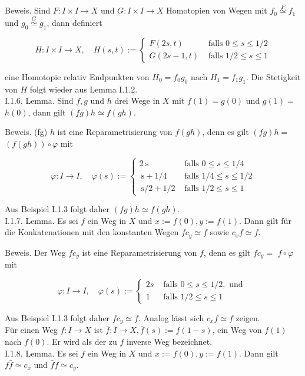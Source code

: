 \documentclass[10pt]{article}
\begin{document}
Beweis. Sind $F: I \times I \rightarrow X$ und $G: I \times I \rightarrow X$ Homotopien von Wegen mit $f_{0} \stackrel{F}{\simeq} f_{1}$ und $g_{0} \stackrel{G}{\simeq} g_{1}$, dann definiert

$$
H: I \times I \rightarrow X, \quad H(s, t):= \begin{cases}F(2 s, t) & \text { falls } 0 \leq s \leq 1 / 2 \\ G(2 s-1, t) & \text { falls } 1 / 2 \leq s \leq 1\end{cases}
$$

eine Homotopie relativ Endpunkten von $H_{0}=f_{0} g_{0}$ nach $H_{1}=f_{1} g_{1}$. Die Stetigkeit von $H$ folgt wieder aus Lemma I.1.2.\\
I.1.6. Lemma. Sind $f, g$ und $h$ drei Wege in $X$ mit $f(1)=g(0)$ und $g(1)=$ $h(0)$, dann gilt $(f g) h \simeq f(g h)$.

Beweis. (fg) $h$ ist eine Reparametrisierung von $f(g h)$, denn es gilt $(f g) h=$ $(f(g h)) \circ \varphi$ mit

$$
\varphi: I \rightarrow I, \quad \varphi(s):= \begin{cases}2 \mathrm{~s} & \text { falls } 0 \leq s \leq 1 / 4 \\ \mathrm{~s}+1 / 4 & \text { falls } 1 / 4 \leq s \leq 1 / 2 \\ \mathrm{~s} / 2+1 / 2 & \text { falls } 1 / 2 \leq s \leq 1\end{cases}
$$

Aus Beispiel I.1.3 folgt daher $(f g) h \simeq f(g h)$.\\
I.1.7. Lemma. Es sei $f$ ein Weg in $X$ und $x:=f(0), y:=f(1)$. Dann gilt für die Konkatenationen mit den konstanten Wegen $f c_{y} \simeq f$ sowie $c_{x} f \simeq f$.

Beweis. Der Weg $f c_{y}$ ist eine Reparametrisierung von $f$, denn es gilt $f c_{y}=$ $f \circ \varphi$ mit

$$
\varphi: I \rightarrow I, \quad \varphi(s):= \begin{cases}2 s & \text { falls } 0 \leq s \leq 1 / 2, \text { und } \\ 1 & \text { falls } 1 / 2 \leq s \leq 1\end{cases}
$$

Aus Beispiel I.1.3 folgt daher $f c_{y} \simeq f$. Analog lässt sich $c_{x} f \simeq f$ zeigen.\\
Für einen Weg $f: I \rightarrow X$ ist $\bar{f}: I \rightarrow X, \bar{f}(s):=f(1-s)$, ein Weg von $f(1)$ nach $f(0)$. Er wird als der zu $f$ inverse Weg bezeichnet.\\
I.1.8. Lemma. Es sei $f$ ein Weg in $X$ und $x:=f(0), y:=f(1)$. Dann gilt $f \bar{f} \simeq c_{x}$ und $\bar{f} f \simeq c_{y}$.
\end{document}
